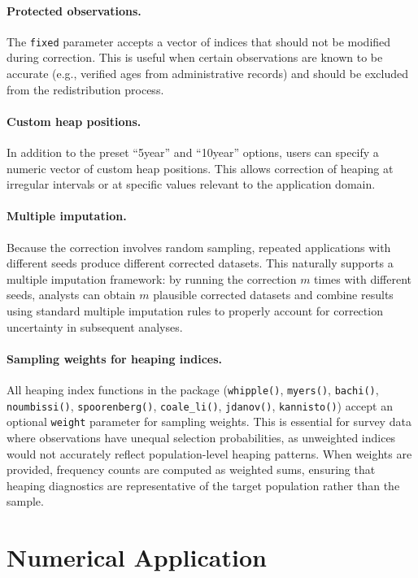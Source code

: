 \documentclass[12pt]{article}
\theoremstyle{plain}
\theoremstyle{definition}
\begin{document}
\paragraph{Protected observations.} The \texttt{fixed} parameter accepts a vector of indices that should not be modified during correction. This is useful when certain observations are known to be accurate (e.g., verified ages from administrative records) and should be excluded from the redistribution process.

\paragraph{Custom heap positions.} In addition to the preset ``5year'' and ``10year'' options, users can specify a numeric vector of custom heap positions. This allows correction of heaping at irregular intervals or at specific values relevant to the application domain.

\paragraph{Multiple imputation.} Because the correction involves random sampling, repeated applications with different seeds produce different corrected datasets. This naturally supports a multiple imputation framework: by running the correction $m$ times with different seeds, analysts can obtain $m$ plausible corrected datasets and combine results using standard multiple imputation rules to properly account for correction uncertainty in subsequent analyses.

\paragraph{Sampling weights for heaping indices.} All heaping index functions in the package (\texttt{whipple()}, \texttt{myers()}, \texttt{bachi()}, \texttt{noumbissi()}, \texttt{spoorenberg()}, \texttt{coale\_li()}, \texttt{jdanov()}, \texttt{kannisto()}) accept an optional \texttt{weight} parameter for sampling weights. This is essential for survey data where observations have unequal selection probabilities, as unweighted indices would not accurately reflect population-level heaping patterns. When weights are provided, frequency counts are computed as weighted sums, ensuring that heaping diagnostics are representative of the target population rather than the sample.


\section{Numerical Application}
\end{document}
